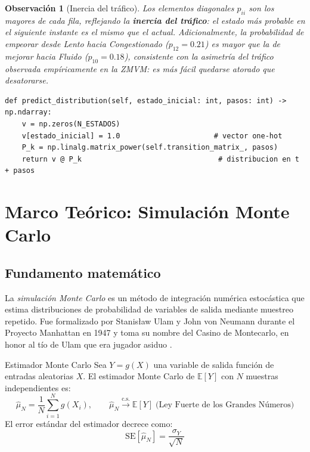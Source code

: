 \documentclass[11pt,a4paper]{article}
\newtheorem{observacion}{Observación}
\begin{document}
\begin{observacion}[Inercia del tráfico]
Los elementos diagonales $p_{ii}$ son los mayores de cada fila, reflejando la \textbf{inercia del tráfico}: el estado más probable en el siguiente instante es el mismo que el actual. Adicionalmente, la probabilidad de empeorar desde \textit{Lento} hacia \textit{Congestionado} ($p_{12} = 0.21$) es mayor que la de mejorar hacia \textit{Fluido} ($p_{10} = 0.18$), consistente con la asimetría del tráfico observada empíricamente en la ZMVM: es más fácil quedarse atorado que desatorarse.
\end{observacion}

\begin{lstlisting}[caption={Predicción de distribución en $k$ pasos, ecuación~\eqref{eq:kpasos}.},label={lst:predict}]
def predict_distribution(self, estado_inicial: int, pasos: int) -> np.ndarray:
    v = np.zeros(N_ESTADOS)
    v[estado_inicial] = 1.0                      # vector one-hot
    P_k = np.linalg.matrix_power(self.transition_matrix_, pasos)
    return v @ P_k                                # distribucion en t + pasos
\end{lstlisting}

\section{Marco Teórico: Simulación Monte Carlo}

\subsection{Fundamento matemático}

La \textit{simulación Monte Carlo} es un método de integración numérica estocástica que estima distribuciones de probabilidad de variables de salida mediante muestreo repetido. Fue formalizado por Stanisław Ulam y John von Neumann durante el Proyecto Manhattan en 1947 y toma su nombre del Casino de Montecarlo, en honor al tío de Ulam que era jugador asiduo \cite{rubinstein2016}.

\begin{defbox}{Estimador Monte Carlo}
Sea $Y = g(X)$ una variable de salida función de entradas aleatorias $X$. El estimador Monte Carlo de $\mathbb{E}[Y]$ con $N$ muestras independientes es:
\begin{equation}
\hat{\mu}_N = \frac{1}{N}\sum_{i=1}^{N} g(X_i), \qquad \hat{\mu}_N \xrightarrow{\text{c.s.}} \mathbb{E}[Y] \; \text{(Ley Fuerte de los Grandes Números)}
\end{equation}
El error estándar del estimador decrece como:
\begin{equation}
\text{SE}[\hat{\mu}_N] = \frac{\sigma_Y}{\sqrt{N}}
\label{eq:seMC}
\end{equation}
\end{defbox}
\end{document}
